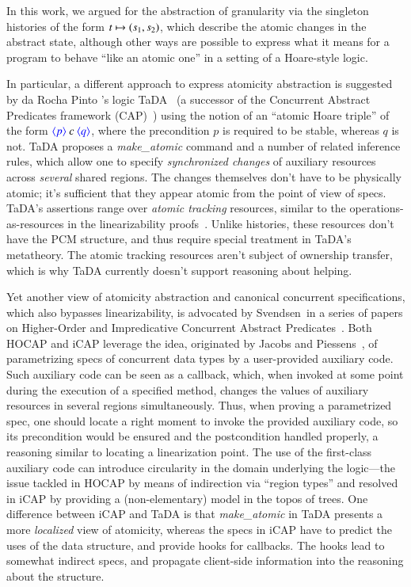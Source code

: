 In this work, we argued for the abstraction of granularity via the
singleton histories of the form $t \mapsto (s_1, s_2)$, which describe
the atomic changes in the abstract state, although other ways are
possible to express what it means for a program to behave ``like an
atomic one'' in a setting of a Hoare-style logic.

In particular, a different approach to express atomicity abstraction
is suggested by da Rocha Pinto \etal's logic
TaDA~\cite{ArrozPincho-al:ECOOP14} (a successor of the Concurrent
Abstract Predicates framework (CAP)~\cite{DinsdaleYoung-al:ECOOP10})
using the notion of an ``atomic Hoare triple'' of the form
$\textcolor{blue}{\langle{p}\rangle}~c~\textcolor{blue}{\langle{q}\rangle}$, where the precondition $p$ is required to
be stable, whereas $q$ is not.
% 
TaDA proposes a \emph{make\_atomic} command and a number of related
inference rules, which allow one to specify \emph{synchronized
  changes} of auxiliary resources across \emph{several} shared
regions. The changes themselves don't have to be physically atomic;
it's sufficient that they appear atomic from the point of view of
specs. TaDA's assertions range over \emph{atomic tracking} resources,
similar to the operations-as-resources in the linearizability
proofs~\cite{Liang-Feng:PLDI13,Turon-al:ICFP13}. Unlike histories,
these resources don't have the PCM structure, and thus require special
treatment in TaDA's metatheory. The atomic tracking resources aren't
subject of ownership transfer, which is why TaDA currently doesn't
support reasoning about helping.

Yet another view of atomicity abstraction and canonical concurrent
specifications, which also bypasses linearizability, is advocated by
Svendsen~\etal in a series of papers on Higher-Order and Impredicative
Concurrent Abstract
Predicates~\cite{Svendsen-al:ESOP13,Svendsen-Birkedal:ESOP14}.
%
Both HOCAP and iCAP leverage the idea, originated by Jacobs and
Piessens~\cite{Jacobs-Piessens:POPL11}, of parametrizing specs of
concurrent data types by a user-provided auxiliary code.
%
Such auxiliary code can be seen as a callback, which, when invoked at
some point during the execution of a specified method, changes the
values of auxiliary resources in several regions simultaneously.
%
Thus, when proving a parametrized spec, one should locate a right
moment to invoke the provided auxiliary code, so its precondition
would be ensured and the postcondition handled properly, a reasoning
similar to locating a linearization point.
%
The use of the first-class auxiliary code can introduce circularity in
the domain underlying the logic---the issue tackled in HOCAP by means
of indirection via ``region types'' and resolved in iCAP by providing
a (non-elementary) model in the topos of trees.
%
One difference between iCAP and TaDA is that \emph{make\_atomic} in
TaDA presents a more \emph{localized} view of atomicity, whereas the
specs in iCAP have to predict the uses of the data structure, and
provide hooks for callbacks. The hooks lead to somewhat indirect
specs, and propagate client-side information into the reasoning about
the structure.

